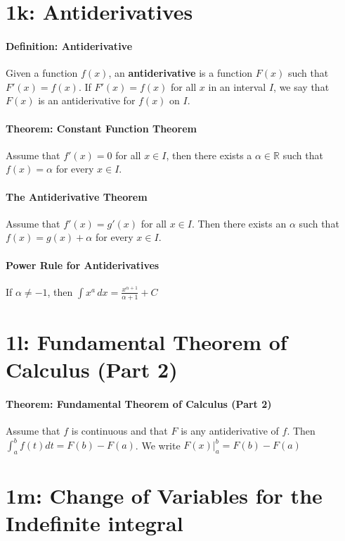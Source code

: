 \documentclass[10pt,letter]{article}
\begin{document}
\section*{1k: Antiderivatives}
\paragraph{Definition: Antiderivative}
Given a function $f(x)$, an \textbf{antiderivative} is a function $F(x)$ such that $F'(x)=f(x)$. If $F'(x)=f(x)$ for all $x$ in an interval $I$, we say that $F(x)$ is an antiderivative for $f(x)$ on $I$. 
\paragraph{Theorem: Constant Function Theorem} 
Assume that $f'(x)=0$ for all $x\in I$, then there exists a $\alpha\in\mathbb{R}$ such that $f(x)=\alpha$ for every $x\in I$. 
\paragraph{The Antiderivative Theorem} 
Assume that $f'(x)=g'(x)$ for all $x\in I$. Then there exists an $\alpha$ such that $f(x)=g(x)+\alpha$ for every $x\in I$. 
\paragraph{Power Rule for Antiderivatives}
If $\alpha\neq-1$, then $\int x^a\,dx=\frac{x^{\alpha+1}}{\alpha+1}+C$

\section*{1l: Fundamental Theorem of Calculus (Part 2)}
\paragraph{Theorem: Fundamental Theorem of Calculus (Part 2)}
Assume that $f$ is continuous and that $F$ is any antiderivative of $f$. Then $\int_a^bf(t)dt=F(b)-F(a)$. We write $F(x)|_a^b=F(b)-F(a)$


\section*{1m: Change of Variables for the Indefinite integral}
\end{document}
